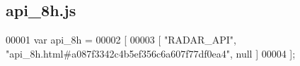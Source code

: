 \subsection{api\+\_\+8h.\+js}
\label{api__8h_8js_source}

\begin{DoxyCode}
00001 var api_8h =
00002 [
00003     [ \textcolor{stringliteral}{"RADAR\_API"}, \textcolor{stringliteral}{"api\_8h.html#a087f3342c4b5ef356c6a607f77df0ea4"}, null ]
00004 ];
\end{DoxyCode}
